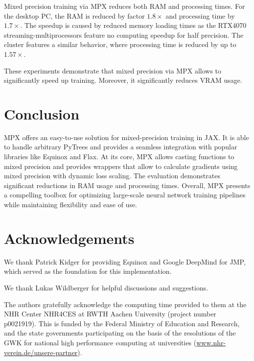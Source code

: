 \documentclass[logo]{dsme}
\newcommand{\mpx}{\textsc{MPX}}
\begin{document}
Mixed precision training via \mpx{} reduces both RAM and processing times.
For the desktop PC, the RAM is reduced by factor $1.8\times$ and processing time by $1.7\times$.
The speedup is caused by reduced memory loading times as the RTX4070 streaming-multiprocessors feature no computing speedup for half precision.
The cluster features a similar behavior, where processing time is reduced by up to $1.57\times$.

These experiments demonstrate that mixed precision via \mpx{} allows to significantly speed up training.
Moreover, it significantly reduces VRAM usage.


\section{Conclusion}

\mpx{} offers an easy-to-use solution for mixed-precision training in JAX.
It is able to handle arbitrary PyTrees and provides a seamless integration with popular libraries like Equinox and Flax. 
At its core, \mpx{} allows casting functions to mixed precision and provides wrappers that allow to calculate gradients using mixed precision with dynamic loss scaling.
The evaluation demonstrates significant reductions in RAM usage and processing times. 
Overall, MPX presents a compelling toolbox for optimizing large-scale neural network training pipelines while maintaining flexibility and ease of use.


\section{Acknowledgements}
We thank Patrick Kidger for providing Equinox and Google DeepMind for JMP, which served as the foundation for this implementation.

We thank Lukas Wildberger for helpful discussions and suggestions.

The authors gratefully acknowledge the computing time provided to them at the NHR Center NHR4CES at RWTH Aachen University (project number p0021919). This is funded by the Federal Ministry of Education and Research, and the state governments participating on the basis of the resolutions of the GWK for national high performance computing at universities (\url{www.nhr-verein.de/unsere-partner}).


\end{document}
